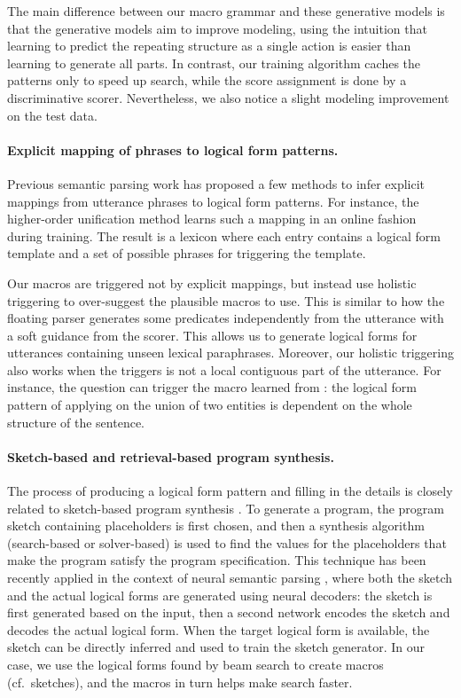 The main difference between our macro grammar
and these generative models
is that the generative models aim to improve modeling,
using the intuition that
learning to predict the repeating structure as a single action
is easier than learning to generate all parts.
In contrast, our training algorithm
caches the patterns only to speed up search,
while the score assignment is done by a discriminative
scorer.
Nevertheless, we also notice a slight modeling improvement
on the test data.

\paragraph{Explicit mapping of phrases to logical form patterns.}
Previous semantic parsing work
has proposed a few methods to infer explicit
mappings from utterance phrases to logical form patterns.
For instance, the higher-order unification method
\cite{kwiatkowski10ccg,kwiatkowski11lex}
learns such a mapping in an online fashion
during training.
The result is a lexicon where each entry
contains a logical form template and a set of possible phrases
for triggering the template.

Our macros are triggered not by explicit mappings,
but instead use holistic triggering to
over-suggest the plausible macros to use.
This is similar to how the floating parser generates
some predicates independently from the utterance
with a soft guidance from the scorer.
This allows us to generate logical forms for utterances
containing unseen lexical paraphrases.
Moreover, our holistic triggering also works
when the triggers is not a local contiguous part
of the utterance.
For instance, the question
can trigger the macro learned from
:
the logical form pattern of applying 
on the union of two entities is dependent on the
whole structure of the sentence.

\paragraph{Sketch-based and retrieval-based program synthesis.}
The process of producing a logical form pattern
and filling in the details
is closely related to sketch-based program synthesis
\cite{solar05sketching}.
To generate a program,
the program sketch containing placeholders
is first chosen,
and then a synthesis algorithm
(search-based or solver-based)
is used to find the values for the placeholders
that make the program satisfy the program specification.
This technique has been
recently applied in the context of
neural semantic parsing
\cite{dong2018coarse},
where both the sketch and the actual logical forms
are generated using neural decoders:
the sketch is first generated based on the input,
then a second network encodes the sketch
and decodes the actual logical form.
When the target logical form is available,
the sketch can be directly inferred
and used to train the sketch generator.
In our case, we use the logical forms found by beam search
to create macros (cf.\ sketches),
and the macros in turn helps make search faster.

